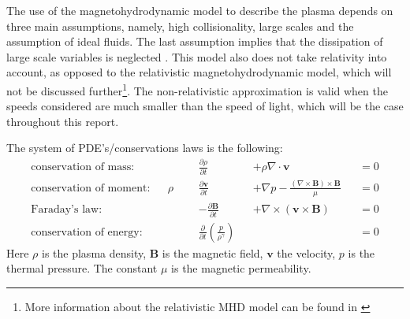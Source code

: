 \documentclass[a4paper]{article}
\numberwithin{figure}{section}
\numberwithin{equation}{section}
\begin{document}
\medskip

The use of the magnetohydrodynamic model to describe the plasma depends on three main assumptions, namely, high collisionality, large scales and the assumption of ideal fluids. The last assumption implies that the dissipation of large scale variables is neglected \cite{goedbloed2004principles}. This model also does not take relativity into account, as opposed to the relativistic magnetohydrodynamic model, which will not be discussed further\footnote{More information about the relativistic MHD model can be found in \cite{karas2005introduction}}. The non-relativistic approximation is valid when the speeds considered are much smaller than the speed of light, which will be the case throughout this report.

The system of PDE's/conservations laws is the following:
\begin{subequations}\label{eq:MHD}
\begin{alignat}{4}
	\text{conservation of mass:}& &\quad\quad &\frac{\partial \rho}{\partial t} & & +\rho \nabla \cdot \mathbf v& &= 0 \label{eq:mass}\\ 	
	\text{conservation of moment:}& & \rho& \frac{\partial \mathbf v}{\partial t} & &+ \nabla p - \frac{(\nabla \times \mathbf B) \times \mathbf B}{\mu}& &=  0 \label{eq:cauchymoment} \\
	\text{Faraday's law:}& & &-\frac{\partial \mathbf B}{\partial t} & &+ \nabla \times (\mathbf v \times \mathbf B)& &= 0 \label{eq:faraday}\\
	\text{conservation of energy:}& & &\frac{\partial }{\partial t} \left( \frac{p}{\rho^{\gamma}} \right)  & & & &= 0 \label{eq:energy} 
\end{alignat}
\end{subequations}
Here $\rho$ is the plasma density, $\mathbf B$ is the magnetic field,  $\mathbf v$ the velocity, $p$ is the thermal pressure. The constant $\mu$ is the magnetic permeability. 
\end{document}
